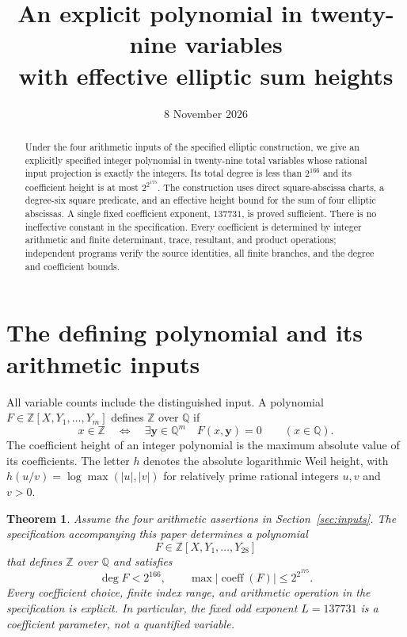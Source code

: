 \documentclass[11pt,a4paper]{article}
\title{An explicit polynomial in twenty-nine variables\\
with effective elliptic sum heights}
\author{}\date{8 November 2026}
\newtheorem{theorem}{Theorem}\newtheorem{lemma}[theorem]{Lemma}
\newcommand{\Q}{\mathbb Q}\newcommand{\Z}{\mathbb Z}
\begin{document}
\maketitle
\begin{abstract}
Under the four arithmetic inputs of the specified elliptic construction,
we give an explicitly specified integer polynomial in twenty-nine total
variables whose rational input projection is exactly the integers.
Its total degree is less than $2^{166}$ and its coefficient height is
at most $2^{2^{175}}$. The construction uses direct square-abscissa
charts, a degree-six square predicate, and an effective height bound
for the sum of four elliptic abscissas. A single fixed coefficient
exponent, $137731$, is proved sufficient. There is no ineffective
constant in the specification. Every coefficient is determined by
integer arithmetic and finite determinant, trace, resultant, and
product operations; independent programs verify the source identities,
all finite branches, and the degree and coefficient bounds.
\end{abstract}

\section{The defining polynomial and its arithmetic inputs}

All variable counts include the distinguished input. A polynomial
$F\in\Z[X,Y_1,\ldots,Y_m]$ defines $\Z$ over $\Q$ if
\[
 x\in\Z\quad\Longleftrightarrow\quad
 \exists\mathbf y\in\Q^m\quad F(x,\mathbf y)=0
 \qquad(x\in\Q).
\]
The coefficient height of an integer polynomial is the maximum
absolute value of its coefficients. The letter $h$ denotes the
absolute logarithmic Weil height, with $h(u/v)=\log\max(|u|,|v|)$
for relatively prime rational integers $u,v$ and $v>0$.

\begin{theorem}\label{thm:main}
Assume the four arithmetic assertions in Section~\ref{sec:inputs}.
The specification accompanying this paper determines a polynomial
\[
                   F\in\Z[X,Y_1,\ldots,Y_{28}]
\]
that defines $\Z$ over $\Q$ and satisfies
\[
             \deg F<2^{166},\qquad
             \max|\operatorname{coeff}(F)|\le2^{2^{175}}.
\]
Every coefficient choice, finite index range, and arithmetic operation
in the specification is explicit. In particular, the fixed odd exponent
$L=137731$ is a coefficient parameter, not a quantified variable.
\end{theorem}
\end{document}
